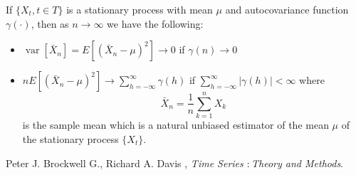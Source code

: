 \documentclass[12pt]{article}
\def\var{\operatorname{var}}
\begin{document}
If $\{ X_t, t \in T \}$ is a stationary process with mean $\mu$ and autocovariance function $\gamma(\cdotp)$, then as $n \to  \infty$
we have the
following:
\begin{itemize}
\item $\var[\bar X_n]= E[ (\bar X_n - \mu)^2 ] \to 0$ if $\gamma(n) \to 0$ 
\item $nE[ (\bar X_n - \mu)^2] \to \sum_{h=-\infty}^{\infty}\gamma(h)$ if
$\sum_{h=-\infty}^{\infty}|\gamma(h)|<\infty$
where
$$\bar X_n=\frac{1}{n}\sum_{k=1}^{n} X_k$$ is the sample mean which is a natural unbiased estimator of the mean $\mu$ of the stationary process  
$\{ X_t\}$.
\end{itemize}
\begin{thebibliography}{6}
Peter J. Brockwell G., Richard A. Davis , {\it Time Series $\colon$Theory and Methods}.
\end{thebibliography}
\end{document}
